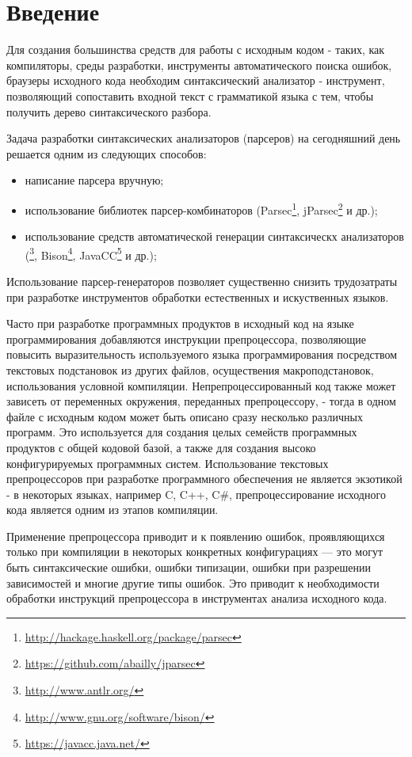 \clearpage
\section{Введение}

Для создания большинства средств для работы с исходным кодом - таких, как компиляторы, среды разработки, инструменты автоматического поиска ошибок, браузеры исходного кода необходим синтаксический анализатор - инструмент, позволяющий сопоставить входной текст с грамматикой языка с тем, чтобы получить дерево синтаксического разбора\cite{aho}.

Задача разработки синтаксических анализаторов (парсеров) на сегодняшний день решается одним из следующих способов:
\begin{itemize}
	\item написание парсера вручную;
	\item использование библиотек парсер-комбинаторов (Parsec\footnote{\url{http://hackage.haskell.org/package/parsec}}, jParsec\footnote{\url{https://github.com/abailly/jparsec}} и др.);
	\item использование средств автоматической генерации синтаксическх анализаторов (\footnote{\url{http://www.antlr.org/}}, Bison\footnote{\url{http://www.gnu.org/software/bison/}}, JavaCC\footnote{\url{https://javacc.java.net/}} и др.);
\end{itemize}
Использование парсер-генераторов позволяет существенно снизить трудозатраты при разработке инструментов обработки естественных и искуственных языков.

Часто при разработке программных продуктов в исходный код на языке программирования добавляются инструкции препроцессора, позволяющие повысить выразительность используемого языка программирования посредством текстовых подстановок из других файлов, осуществения макроподстановок, использования условной компиляции. Непрепроцессированный код также может зависеть от переменных окружения, переданных препроцессору, - тогда в одном файле с исходным кодом может быть описано сразу несколько различных программ. Это используется для создания целых семейств программных продуктов с общей кодовой базой\cite{flightsoftwareproductline}, а также для создания высоко конфигурируемых программных систем. Использование текстовых препроцессоров при разработке программного обеспечения не является экзотикой - в некоторых языках, например C, C++, C\#, препроцессирование исходного кода является одним из этапов компиляции.

Применение препроцессора приводит и к появлению ошибок, проявляющихся только при компиляции в некоторых конкретных конфигурациях --- это могут быть синтаксические ошибки, ошибки типизации, ошибки при разрешении зависимостей и многие другие типы ошибок. Это приводит к необходимости обработки инструкций препроцессора в инструментах анализа исходного кода.

